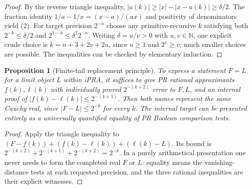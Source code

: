 \documentclass[11pt]{article}
\newtheorem{proposition}[theorem]{Proposition}
\newcommand{\NN}{\mathbb N}\newcommand{\QQ}{\mathbb Q}\newcommand{\PR}{\mathrm{PR}}\newcommand{\iPRA}{\mathrm{iPRA}}\newcommand{\eps}{\varepsilon}
\begin{document}
\begin{proof}
By the reverse triangle inequality, $|a(k)|\ge |x|-|x-a(k)|\ge\delta/2$. The fraction identity $1/a-1/x=(x-a)/(ax)$ and positivity of denominators yield (2). For target precision $2^{-n}$ choose any primitive-recursive $k$ satisfying both $2^{-k}\le\delta/2$ and $2^{1-k}\le\delta^2 2^{-n}$. Writing $\delta=u/v>0$ with $u,v\in\NN$, one explicit crude choice is $k=n+3+2v+2u$, since $u\ge1$ and $2^v\ge v$; much smaller choices are possible. The inequalities can be checked by elementary induction. \end{proof}
\begin{proposition}[Finite-tail replacement principle]
To express a statement $F=L$ for a limit object $L$ within iPRA, it suffices to give PR rational approximants $f(k),\ell(k)$ with individually proved $2^{-(k+2)}$ error to $F,L$, and an internal proof of $|f(k)-\ell(k)|\le2^{-(k+1)}$. Then both names represent the same Cauchy real, since $|F-L|\le2^{-k}$ for every $k$. The internal target can be presented entirely as a universally quantified equality of PR Boolean comparison tests.
\end{proposition}
\begin{proof}
Apply the triangle inequality to $(F-f(k))+(f(k)-\ell(k))+(\ell(k)-L)$. Its bound is $2^{-(k+2)}+2^{-(k+1)}+2^{-(k+2)}=2^{-k}$. In a purely arithmetical presentation one never needs to form the completed real $F$ or $L$: equality means the vanishing-distance tests at each requested precision, and the three rational inequalities are their explicit witnesses.\end{proof}
\end{document}
